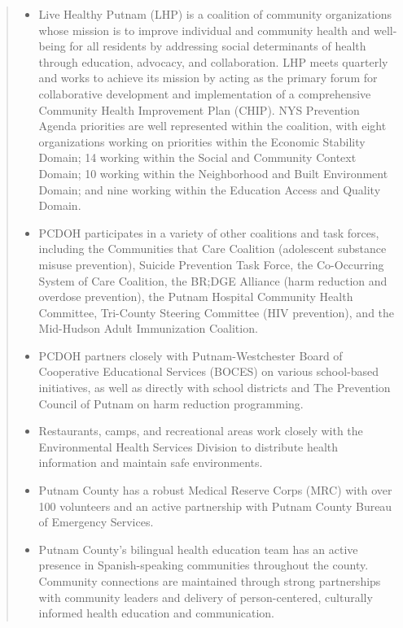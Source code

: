 \documentclass[
  english,
  letterpaper,
]{report}
\providecommand{\tightlist}{%
  \setlength{\itemsep}{0pt}\setlength{\parskip}{0pt}}
\begin{document}
\begin{quote}
\begin{itemize}
\tightlist
\item
  Live Healthy Putnam (LHP) is a coalition of community organizations
  whose mission is to improve individual and community health and
  well-being for all residents by addressing social determinants of
  health through education, advocacy, and collaboration. LHP meets
  quarterly and works to achieve its mission by acting as the primary
  forum for collaborative development and implementation of a
  comprehensive Community Health Improvement Plan (CHIP). NYS Prevention
  Agenda priorities are well represented within the coalition, with
  eight organizations working on priorities within the Economic
  Stability Domain; 14 working within the Social and Community Context
  Domain; 10 working within the Neighborhood and Built Environment
  Domain; and nine working within the Education Access and Quality
  Domain.
\item
  PCDOH participates in a variety of other coalitions and task forces,
  including the Communities that Care Coalition (adolescent substance
  misuse prevention), Suicide Prevention Task Force, the Co-Occurring
  System of Care Coalition, the BR;DGE Alliance (harm reduction and
  overdose prevention), the Putnam Hospital Community Health Committee,
  Tri-County Steering Committee (HIV prevention), and the Mid-Hudson
  Adult Immunization Coalition.
\item
  PCDOH partners closely with Putnam-Westchester Board of Cooperative
  Educational Services (BOCES) on various school-based initiatives, as
  well as directly with school districts and The Prevention Council of
  Putnam on harm reduction programming.
\item
  Restaurants, camps, and recreational areas work closely with the
  Environmental Health Services Division to distribute health
  information and maintain safe environments.
\item
  Putnam County has a robust Medical Reserve Corps (MRC) with over 100
  volunteers and an active partnership with Putnam County Bureau of
  Emergency Services.
\item
  Putnam County's bilingual health education team has an active presence
  in Spanish-speaking communities throughout the county. Community
  connections are maintained through strong partnerships with community
  leaders and delivery of person-centered, culturally informed health
  education and communication.
\end{itemize}
\end{quote}
\end{document}
